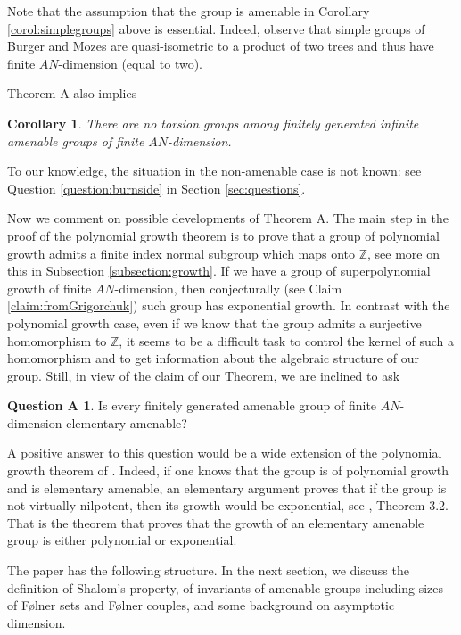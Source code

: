 \documentclass{amsart}
\numberwithin{figure}{section}
\theoremstyle{plain}
\newtheorem{corol}[thm]{Corollary}
\theoremstyle{definition}
\newtheorem*{question*}{Question A}
\begin{document}
Note that the assumption that the group is amenable in Corollary \ref{corol:simplegroups}
above is essential. Indeed, observe that  simple groups of Burger and Mozes 
\cite{burgermozes} are quasi-isometric to a product of two trees and thus
have finite $AN$-dimension (equal to two).


Theorem A also implies
\begin{corol}\label{corol:torsion}
There are no torsion groups among finitely generated infinite amenable groups of finite $AN$-dimension.
\end{corol}
To our knowledge, the situation in the non-amenable case is not known: see Question \ref{question:burnside} in Section \ref{sec:questions}.

Now we comment on possible developments of Theorem A. 
The main step in the proof of the polynomial growth theorem is to prove that a group of polynomial growth admits a finite index normal subgroup which maps onto $\mathbb{Z}$, see more on this in Subsection \ref{subsection:growth}.
If we have a group of  superpolynomial growth of finite $AN$-dimension, then 
conjecturally (see Claim \ref{claim:fromGrigorchuk}) such group has exponential growth. In contrast with the polynomial growth case, even if we know that the group admits a surjective homomorphism to $\mathbb{Z}$, it seems to be a difficult task to control the kernel of such a homomorphism and to get information about the algebraic structure of our group. Still, in view of the claim of our Theorem, we are inclined to ask
\begin{question*} 
Is every finitely generated amenable group of finite $AN$-dimension elementary amenable?
\end{question*}

A positive answer to this question would be a wide extension of the polynomial growth theorem of \cite{gromovpolynomial}.
Indeed, if one knows that the group is of polynomial growth and is elementary amenable, an elementary argument proves that if the group is not virtually nilpotent,
then its growth would be exponential, see \cite{chou}, Theorem 3.2.
That is the theorem that proves that the growth of an elementary amenable group is either polynomial or exponential.

\bigskip

The paper has the following structure.
In the next section, we discuss the definition of Shalom's property, of invariants of amenable groups including sizes of  F{\o}lner sets and F{\o}lner couples, and some background on asymptotic dimension.
\end{document}
